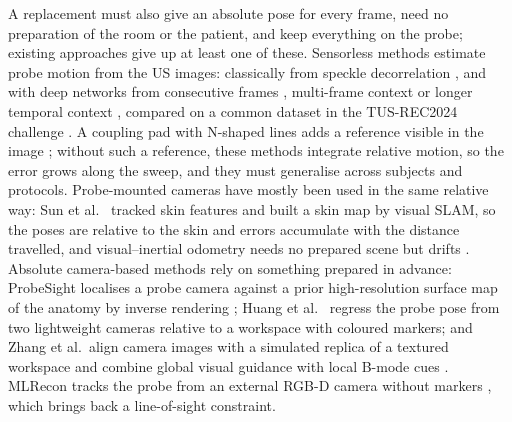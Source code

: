 \documentclass[9pt,shortpaper,twoside,web]{ieeecolor2}
\begin{document}
A replacement must also give an absolute pose for every frame, need no preparation of the room or the patient, and keep everything on the probe; existing approaches give up at least one of these. Sensorless methods estimate probe motion from the US images: classically from speckle decorrelation \cite{TODO-speckle-decorrelation}, and with deep networks from consecutive frames \cite{prevost2018}, multi-frame context \cite{guo2023tbme} or longer temporal context \cite{li2024longterm}, compared on a common dataset in the TUS-REC2024 challenge \cite{li2025tusrec}. A coupling pad with N-shaped lines adds a reference visible in the image \cite{dai2024coupling}; without such a reference, these methods integrate relative motion, so the error grows along the sweep, and they must generalise across subjects and protocols. Probe-mounted cameras have mostly been used in the same relative way: Sun et al.\ \cite{sun2014skin} tracked skin features and built a skin map by visual SLAM, so the poses are relative to the skin and errors accumulate with the distance travelled, and visual--inertial odometry needs no prepared scene but drifts \cite{buchanan2024vio,he2024probemounted}. Absolute camera-based methods rely on something prepared in advance: ProbeSight localises a probe camera against a prior high-resolution surface map of the anatomy by inverse rendering \cite{wang2017probesight}; Huang et al.\ \cite{huang2025lightweight} regress the probe pose from two lightweight cameras relative to a workspace with coloured markers; and Zhang et al.\ align camera images with a simulated replica of a textured workspace \cite{zhang2025servoing} and combine global visual guidance with local B-mode cues \cite{zhang2026seeing}. MLRecon tracks the probe from an external RGB-D camera without markers \cite{zhang2026mlrecon}, which brings back a line-of-sight constraint.
\end{document}
